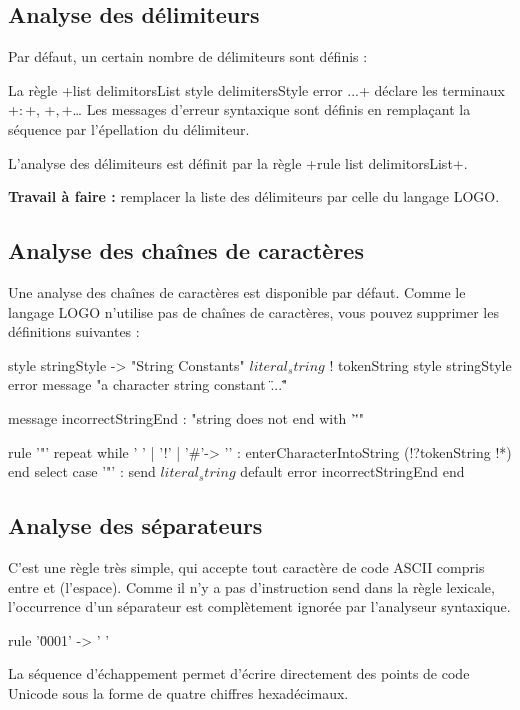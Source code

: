 \subsection{Analyse des délimiteurs}
Par défaut, un certain nombre de délimiteurs sont définis :


La règle \ggs+list delimitorsList style delimitersStyle error ...+ déclare les terminaux \ggs+$:$+, \ggs+$,$+… Les messages d'erreur syntaxique sont définis en remplaçant la séquence  par l’épellation du délimiteur.

L'analyse des délimiteurs est définit par la règle \ggs+rule list delimitorsList+.

\textbf{Travail à faire :} remplacer la liste des délimiteurs par celle du langage LOGO.

\subsection{Analyse des chaînes de caractères}
Une analyse des chaînes de caractères est disponible par défaut. Comme le langage LOGO n’utilise pas de chaînes de caractères, vous pouvez supprimer les définitions suivantes :

\begin{galgas}
style stringStyle -> "String Constants"
$literal_string$ ! tokenString style stringStyle %
                   error message "a character string constant \"...\""

message incorrectStringEnd : "string does not end with '\"'"

rule '"' {
  repeat
  while ' ' | '!' | '#'-> '\uFFFD' :
    enterCharacterIntoString (!?tokenString !*)
  end
  select
  case '"' :
    send $literal_string$
  default
    error incorrectStringEnd
  end
}
\end{galgas}

\subsection{Analyse des séparateurs}
C'est une règle très simple, qui accepte tout caractère de code ASCII compris entre  et  (l'espace). Comme il n'y a pas d'instruction send dans la règle lexicale, l'occurrence d'un séparateur est complètement ignorée par l'analyseur syntaxique.
\begin{galgas}
rule '\u0001' -> ' ' {
}
\end{galgas}
La séquence d'échappement  permet d'écrire directement des points de code Unicode sous la forme de quatre chiffres hexadécimaux.


